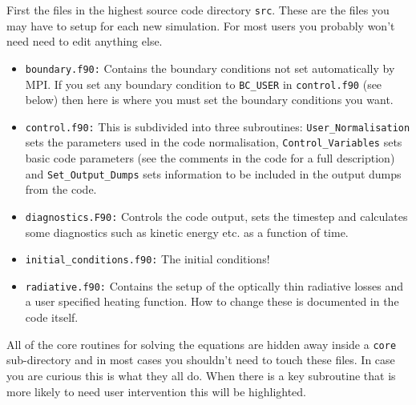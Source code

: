 \documentclass[11pt]{article}
\begin{document}
First the files in the highest source code directory \texttt{src}. These are the files you may have to setup for each 
new simulation. For most users you probably won't need need to edit anything else.
\begin{itemize}
 \item{\texttt{boundary.f90:}} Contains the boundary conditions not set automatically by MPI. If you set any boundary 
 condition to \texttt{BC\_USER} in \texttt{control.f90} (see below) then here is where you must set the boundary 
 conditions you want.
  \item{\texttt{control.f90:}} This is subdivided into three subroutines: \texttt{User\_Normalisation} sets the 
  parameters used in the code normalisation, \texttt{Control\_Variables} sets basic code parameters  (see the 
  comments in the code for a full description) and
\texttt{Set\_Output\_Dumps} sets information to be included in the output dumps from the code.
 \item{\texttt{diagnostics.F90:}} Controls the code output, sets the timestep and calculates some diagnostics such as 
 kinetic energy etc. as a function of time.
  \item{\texttt{initial\_conditions.f90:}} The initial conditions!
  \item{\texttt{radiative.f90:}} Contains the setup of the optically thin radiative losses and a user specified
  heating function. How to change these is documented in the code itself.
\end{itemize}

All of the core routines for solving the equations are hidden away inside a \texttt{core} sub-directory and in most 
cases you shouldn't need to touch these files. In case you are curious this is what they all do. When there is a key 
subroutine that is more likely to need user intervention this will be highlighted.
\end{document}
